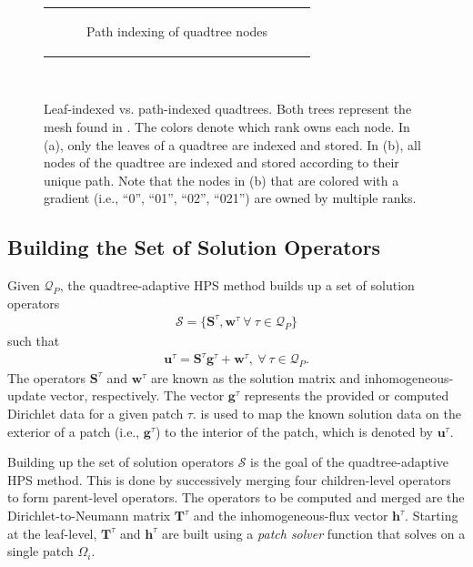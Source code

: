 \begin{figure}
\begin{tabular}{c}
\begin{subfigure}[t]{0.8\textwidth}
            \caption{Path indexing of quadtree nodes}
            \label{subfig:path-indexed-quadtree}
        \end{subfigure}
    \end{tabular}\\
    \caption{Leaf-indexed vs. path-indexed quadtrees. Both trees represent the mesh found in . The colors denote which rank owns each node. In (a), only the leaves of a quadtree are indexed and stored. In (b), all nodes of the quadtree are indexed and stored according to their unique path. Note that the nodes in (b) that are colored with a gradient (i.e., ``0'', ``01'', ``02'', ``021'') are owned by multiple ranks.}
    \label{fig:quadtree_indexing}
\end{figure}

\subsection{Building the Set of Solution Operators}
\label{sub:building-set-of-solution-operators}

Given $\mathcal{Q}_P$, the quadtree-adaptive HPS method builds up a set of solution operators
\begin{align}
    \mathcal{S} = \{\textbf{S}^{\tau}, \textbf{w}^{\tau}\ \forall\ \tau \in \mathcal{Q}_P\}
\end{align}
such that
\begin{align}
    \textbf{u}^{\tau} = \textbf{S}^{\tau} \textbf{g}^{\tau} + \textbf{w}^{\tau},\ \forall\ \tau \in \mathcal{Q}_P.
    \label{eq:u-Sg-w}
\end{align}
The operators $\textbf{S}^{\tau}$ and $\textbf{w}^{\tau}$ are known as the solution matrix and inhomogeneous-update vector, respectively. The vector $\textbf{g}^{\tau}$ represents the provided or computed Dirichlet data for a given patch $\tau$.  is used to map the known solution data on the exterior of a patch (i.e., $\textbf{g}^{\tau}$) to the interior of the patch, which is denoted by $\textbf{u}^{\tau}$.

Building up the set of solution operators $\mathcal{S}$ is the goal of the quadtree-adaptive HPS method. This is done by successively merging four children-level operators to form parent-level operators. The operators to be computed and merged are the Dirichlet-to-Neumann matrix $\textbf{T}^{\tau}$ and the inhomogeneous-flux vector $\textbf{h}^{\tau}$. Starting at the leaf-level, $\textbf{T}^{\tau}$ and $\textbf{h}^{\tau}$ are built using a {\em patch solver} function that solves  on a single patch ${\Omega_i}$.

